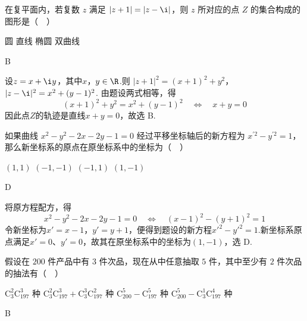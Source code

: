 \begin{problem}

在复平面内，若复数 \(z\) 满足 \(|z + 1| = |z - \i|\)，则 \(z\) 所对应的点 \(Z\) 的集合构成的图形是（\(\quad\)）

\choices
    {圆}
    {直线}
    {椭圆}
    {双曲线}
\end{problem}

\begin{answer}
B
\end{answer}

\begin{solution}
设\(z=x+\i y\)，其中\(x\)，\(y\in\R\).则
\(|z+1|^2=(x+1)^2+y^2\)，\(|z-\i|^2=x^2+(y-1)^2\).
由题设两式相等，得
\[
(x+1)^2+y^2=x^2+(y-1)^2
\quad\Longleftrightarrow\quad
x+y=0
\]
因此点\(Z\)的轨迹是直线\(x+y=0\)，故选 B.
\end{solution}

\begin{problem}

如果曲线 \(x^{2} - y^{2} - 2x - 2y - 1 = 0\) 经过平移坐标轴后的新方程为 \(x^{\prime 2} - y^{\prime 2} = 1\)，那么新坐标系的原点在原坐标系中的坐标为（\(\quad\)）

\choices
    {\((1,1)\)}
    {\((-1, - 1)\)}
    {\((-1, 1)\)}
    {\((1, - 1)\)}
\end{problem}

\begin{answer}
D
\end{answer}

\begin{solution}
将原方程配方，得
\[
x^2-y^2-2x-2y-1=0
\quad\Longleftrightarrow\quad
(x-1)^2-(y+1)^2=1
\]
令新坐标为\(x'=x-1\)，\(y'=y+1\)，便得到题设的新方程\(x'^2-y'^2=1\).新坐标系原点满足\(x'=0\)、\(y'=0\)，故其在原坐标系中的坐标为\((1,-1)\)，选 D.
\end{solution}

\begin{problem}

假设在 \(200\) 件产品中有 \(3\) 件次品，现在从中任意抽取 \(5\) 件，其中至少有 \(2\) 件次品的抽法有（\(\quad\)）

\choices
    {\(\mathrm C_3^2\mathrm C_{197}^3\) 种}
    {\(\mathrm C_3^2\mathrm C_{197}^3 + \mathrm C_3^3\mathrm C_{197}^2\) 种}
    {\(\mathrm C_{200}^5 - \mathrm C_{197}^5\) 种}
    {\(\mathrm C_{200}^5 - \mathrm C_3^1\mathrm C_{197}^4\) 种}
\end{problem}

\begin{answer}
B
\end{answer}


